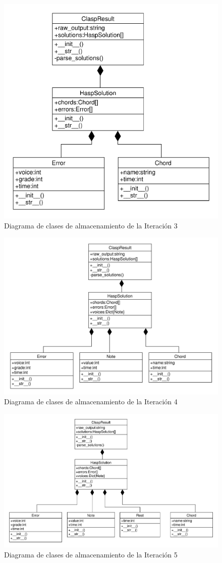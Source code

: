 \begin{figure}[th]
	\centering
	\includegraphics[width=0.8\linewidth]{imagenes/third_iter.pdf}
	\caption{Diagrama de clases de almacenamiento de la Iteración 3}
	\label{fig:class_diagram_third}
\end{figure}
\newpage
\begin{figure}[th]
	\centering
	\includegraphics[width=0.8\linewidth]{imagenes/fourth_iter.pdf}
	\caption{Diagrama de clases de almacenamiento de la Iteración 4}
	\label{fig:class_diagram_fourth}
\end{figure}
\begin{figure}[th]
	\centering
	\includegraphics[width=0.8\linewidth]{imagenes/fifth_iter.pdf}
	\caption{Diagrama de clases de almacenamiento de la Iteración 5}
	\label{fig:class_diagram_fifth}
\end{figure}
